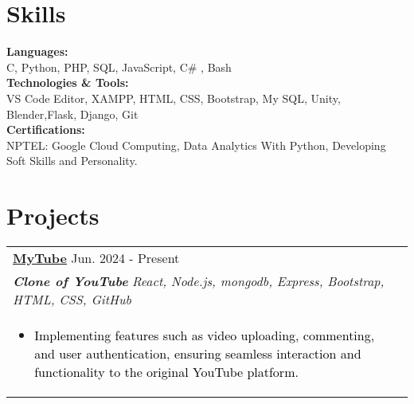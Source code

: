 \documentclass[a4paper,8pt]{article}
\begin{document}
\vspace{10pt}
\section{Skills}
\color[HTML]{1C033C}\textbf{Languages:} \\[2pt]
\color[HTML]{371e77} \hspace*{4ex} C, Python, PHP, SQL, JavaScript, C\#
, Bash \\[3pt]
\color[HTML]{1C033C}\textbf{Technologies \& Tools:} \\[2pt]
\color[HTML]{371e77} \hspace*{4ex} VS Code Editor, XAMPP, HTML, CSS, Bootstrap, My SQL, Unity, Blender,Flask, Django, Git\\[3pt]
\color[HTML]{1C033C}\textbf{Certifications:} \\[2pt]
\color[HTML]{371e77} \hspace*{4ex} {{NPTEL: Google Cloud Computing, Data Analytics With Python, Developing Soft Skills and Personality}}.





\vspace{10pt}

\section{Projects}
\begin{tabularx}{\linewidth}{ @{}l r@{} }

\color[HTML]{1C033C} \textbf{\uline{\href{https://github.com/Himanshiprajapati/MyTube}{MyTube}}} \hfill \color[HTML]{371e77} Jun. 2024 - Present\\[4pt]
\color[HTML]{371e77}\textbf{\textit{Clone of YouTube }} \hfill \color[HTML]{4B28A4} \textit{React, Node.js, mongodb, Express, Bootstrap, HTML, CSS, GitHub}\\[5pt]
\begin{minipage}[t]{\linewidth}
    \begin{itemize}[nosep,after=\strut, leftmargin=2em, itemsep=2pt]
        
        \item \textcolor{black} {Implementing features such as video uploading, commenting, and user authentication, ensuring seamless interaction and functionality to the original YouTube platform.}
    \end{itemize}
    \end{minipage}\end{tabularx}
\end{document}
